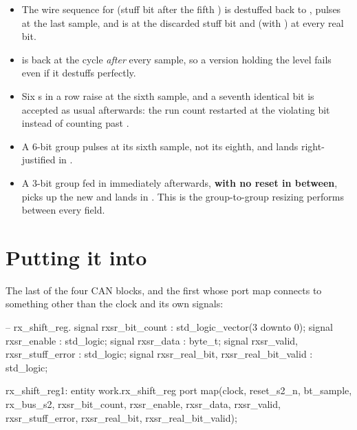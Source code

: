 \begin{itemize}
  \item The wire sequence for  (stuff bit after the fifth ) is destuffed
    back to ,  pulses at the last sample, and  is
     at the discarded stuff bit and  (with ) at every
    real bit.
  \item {} is back at  the cycle \emph{after} every sample, so a version
    holding the level fails even if it destuffs perfectly.
  \item Six s in a row raise  at the sixth sample, and a seventh identical
    bit is accepted as usual afterwards: the run count restarted at the violating bit instead of
    counting past .
  \item A 6-bit group pulses  at its sixth sample, not its eighth, and lands
    right-justified in .
  \item A 3-bit group fed in immediately afterwards, \textbf{with no reset in between}, picks up the
    new  and lands in . This is the group-to-group resizing
     performs between every field.
\end{itemize}

\section{Putting it into }
\label{c15:sec:wire}

The last of the four CAN blocks, and the first whose port map connects to something other than the
clock and its own signals:

\begin{vhdlcode}
    -- rx_shift_reg.
    signal rxsr_bit_count                     : std_logic_vector(3 downto 0);
    signal rxsr_enable                        : std_logic;
    signal rxsr_data                          : byte_t;
    signal rxsr_valid,    rxsr_stuff_error    : std_logic;
    signal rxsr_real_bit, rxsr_real_bit_valid : std_logic;
\end{vhdlcode}

\begin{vhdlcode}
    rx_shift_reg1: entity work.rx_shift_reg
        port map(clock, reset_s2_n, bt_sample, rx_bus_s2, rxsr_bit_count, rxsr_enable,
                 rxsr_data, rxsr_valid, rxsr_stuff_error, rxsr_real_bit, rxsr_real_bit_valid);
\end{vhdlcode}

